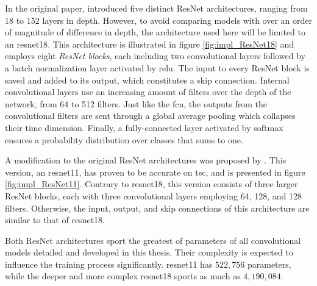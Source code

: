In the original paper, \textcite{he2015} introduced five distinct ResNet architectures, ranging from 18 to 152 layers in depth. However, to avoid comparing models with over an order of magnitude of difference in depth, the architecture used here will be limited to an \acrfull{resnet18}. This architecture is illustrated in figure \ref{fig:impl_ResNet18} and employs eight \textit{ResNet blocks}, each including two convolutional layers followed by a batch normalization layer activated by \acrshort{relu}. The input to every ResNet block is saved and added to its output, which constitutes a skip connection. Internal convolutional layers use an increasing amount of filters over the depth of the network, from 64 to 512 filters. Just like the \acrshort{fcn}, the outputs from the convolutional filters are sent through a global average pooling which collapses their time dimension. Finally, a fully-connected layer activated by softmax ensures a probability distribution over classes that sums to one.

A modification to the original ResNet architectures was proposed by \textcite{wang2016}. This version, an \acrfull{resnet11}, has proven to be accurate on \acrshort{tsc}, and is presented in figure \ref{fig:impl_ResNet11}. Contrary to \acrshort{resnet18}, this version consists of three larger ResNet blocks, each with three convolutional layers employing 64, 128, and 128 filters. Otherwise, the input, output, and skip connections of this architecture are similar to that of \acrshort{resnet18}.

Both ResNet architectures sport the greatest of parameters of all convolutional models detailed and developed in this thesis. Their complexity is expected to influence the training process significantly. \acrshort{resnet11} has $522,756$ parameters, while the deeper and more complex \acrshort{resnet18} sports as much as $4,190,084$. 




